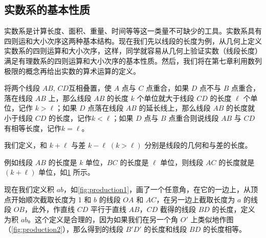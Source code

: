 \subsection{实数系的基本性质}
实数系是计算长度、面积、重量、时间等等这一类量不可缺少的工具。实数系具有四则运和大小次序这两种基本结构。现在我们先以线段的长度为例，从几何上定义实数系的四则运算和大小次序，这样，同学就容易从几何上验证实数（线段长度）满足有理数系的四则运算和大小次序的基本性质。然后，我们将在第七章利用数列极限的概念再给出实数的算术运算的定义。

将两个线段 $AB$, $CD $互相叠置，使 $A$ 点与 $C$ 点重合，如果 $D$ 点不与 $B$ 点重合，落在线段 $AB$ 上，那么线段 $AB$ 的长度 $k$ 个单位就大于线段 $CD$ 的长度 $\ell$ 个单位，记作 $k>\ell$；如果 $D$ 点落在线段 $AB$ 的延长线上，那么线段 $AB$ 的长度就小于线段 $CD$ 的长度，记作$k<\ell$；如果 $D$ 点与 $B$ 点重合则说线段 $AB$ 与 $CD$ 有相等长度，记作$k=\ell$。

我们定义，和 $k+\ell$ 与差 $k-\ell\; (k>\ell )$ 分别是线段的几何和与差的长度。

例如线段 $AB$ 的长度是 $k$ 单位，$BC$ 的长度是 $\ell$ 单位，则线段 $AC$ 的长度就是 $(k+\ell)$ 单位，如\cref{fig:length} 所示。
\begin{figure}
    \caption{}\label{fig:length}
\end{figure}

现在我们定义积 $ab$，如\cref{fig:production1}，画了一个任意角，在它的一边上，从顶点开始顺次截取长度为 1 和 $b$ 的线段 $OA$ 和 $AC$，在另一边上截取长度为 $a$ 的线段 $OB$，此外，作直线 $CD$ 平行于直线 $AB$，$CD$ 截得的线段 $BD$ 的长度，定义为积 $ab$。这个定义是合理的，因为如果我们在另一个角 $O'$ 上类似地作图（\cref{fig:production2}），那么得到的线段 $B'D'$ 的长度和线段 $BD$ 的长度相等。

